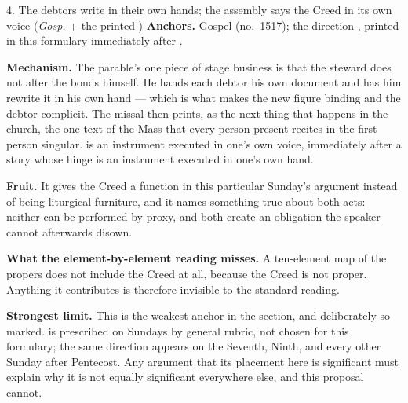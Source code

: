 \begin{proposal}{4. The debtors write in their own hands; the assembly says the
Creed in its own voice \normalfont(\emph{Gosp.} + the printed )}
\textbf{Anchors.} Gospel  (no.\ 1517); the
direction , printed in this formulary immediately after
.

\textbf{Mechanism.} The parable's one piece of stage business is that the
steward does not alter the bonds himself. He hands each debtor his own document
and has him rewrite it in his own hand --- which is what makes the new figure
binding and the debtor complicit. The missal then prints, as the next thing that
happens in the church, the one text of the Mass that every person present
recites in the first person singular.  is an instrument executed in
one's own voice, immediately after a story whose hinge is an instrument executed
in one's own hand.

\textbf{Fruit.} It gives the Creed a function in this particular Sunday's
argument instead of being liturgical furniture, and it names something true about
both acts: neither can be performed by proxy, and both create an obligation the
speaker cannot afterwards disown.

\textbf{What the element-by-element reading misses.} A ten-element map of the
propers does not include the Creed at all, because the Creed is not proper.
Anything it contributes is therefore invisible to the standard reading.

\textbf{Strongest limit.} This is the weakest anchor in the section, and
deliberately so marked.  is prescribed on Sundays by general
rubric, not chosen for this formulary; the same direction appears on the
Seventh, Ninth, and every other Sunday after Pentecost. Any argument that its
placement here is significant must explain why it is not equally significant
everywhere else, and this proposal cannot.
\end{proposal}

